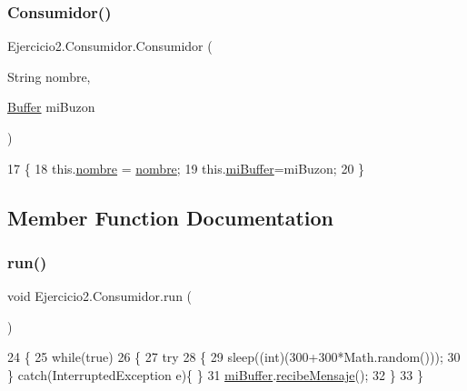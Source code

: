 \subsubsection{\texorpdfstring{Consumidor()}{Consumidor()}}
{\footnotesize\ttfamily Ejercicio2.\+Consumidor.\+Consumidor (\begin{DoxyParamCaption}\item[{String}]{nombre,  }\item[{\mbox{\hyperlink{class_ejercicio2_1_1_buffer}{Buffer}}}]{mi\+Buzon }\end{DoxyParamCaption})\hspace{0.3cm}{\ttfamily [inline]}}


\begin{DoxyCode}
17     \{
18         this.\mbox{\hyperlink{class_ejercicio2_1_1_consumidor_a0efbf67d09a473327b9eeae309e95461}{nombre}} = \mbox{\hyperlink{class_ejercicio2_1_1_consumidor_a0efbf67d09a473327b9eeae309e95461}{nombre}};
19         this.\mbox{\hyperlink{class_ejercicio2_1_1_consumidor_a01ad7eb71084d12b87a1d14ffdcddfb5}{miBuffer}}=miBuzon;
20     \}
\end{DoxyCode}


\subsection{Member Function Documentation}
\mbox{\label{class_ejercicio2_1_1_consumidor_a934013ef29d768c3195cf3b63b16f903}} 
\subsubsection{\texorpdfstring{run()}{run()}}
{\footnotesize\ttfamily void Ejercicio2.\+Consumidor.\+run (\begin{DoxyParamCaption}{ }\end{DoxyParamCaption})\hspace{0.3cm}{\ttfamily [inline]}}


\begin{DoxyCode}
24     \{
25         \textcolor{keywordflow}{while}(\textcolor{keyword}{true})
26         \{
27             \textcolor{keywordflow}{try}
28             \{
29                 sleep((\textcolor{keywordtype}{int})(300+300*Math.random()));
30             \} \textcolor{keywordflow}{catch}(InterruptedException e)\{ \}
31             \mbox{\hyperlink{class_ejercicio2_1_1_consumidor_a01ad7eb71084d12b87a1d14ffdcddfb5}{miBuffer}}.\mbox{\hyperlink{class_ejercicio2_1_1_buffer_a3e868b19d6ff03945998803e3384615c}{recibeMensaje}}();
32         \}
33     \}
\end{DoxyCode}


